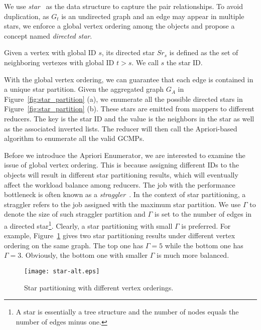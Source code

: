 We use \emph{star}~\cite{yoo2006joinless} as the data structure to capture the pair relationships. 
To avoid duplication, as $G_t$ is an undirected graph and an edge may appear in multiple stars, 
we enforce a global vertex ordering among the objects and propose a concept named \textit{directed star}.

\begin{definition}
Given a vertex with global ID $s$, its directed star $Sr_s$ is defined as the set of neighboring vertexes with global ID $t>s$. We call $s$ the star ID.
\end{definition}

With the global vertex ordering, we can guarantee that each edge is contained in a unique star partition. Given the aggregated graph $G_A$  in Figure~\ref{fig:star_partition} (a), we enumerate all the possible directed stars in Figure~\ref{fig:star_partition} (b). These stars are emitted from mappers to different reducers. The key is the star ID and the value is the neighbors in the star as well as the associated inverted lists. 
The reducer will then call the Apriori-based algorithm to enumerate all the valid GCMPs.


Before we introduce the Apriori Enumerator, we are interested to 
examine the issue of global vertex ordering.
This is because assigning different IDs to the objects will result in 
different star partitioning results, which will eventually affect the workload 
balance among reducers. The job with the performance bottleneck is often known as a  \emph{straggler}~\cite{kwon2012skewtune,coppa2015data}. In the context of star partitioning, a straggler refers to the job assigned with the maximum star partition. We use $\Gamma$ to denote the size of such straggler partition and $\Gamma$ is set to the number of edges in a directed star\footnote{A star is essentially a tree structure and the number of nodes equals the number of edges minus one.}. Clearly, a star partitioning with small $\Gamma$ is preferred. For example, Figure~\ref{fig:star-alt} gives two star partitioning results under 
different vertex ordering on the same graph. The top one has $\Gamma = 5$ while the bottom one has $\Gamma = 3$. Obviously, the bottom one with smaller $\Gamma$ is much more balanced.

\begin{figure}[h]
\centering
\texttt{[image: star-alt.eps]}
\caption{Star partitioning with different vertex orderings.}
\label{fig:star-alt}
\end{figure}

